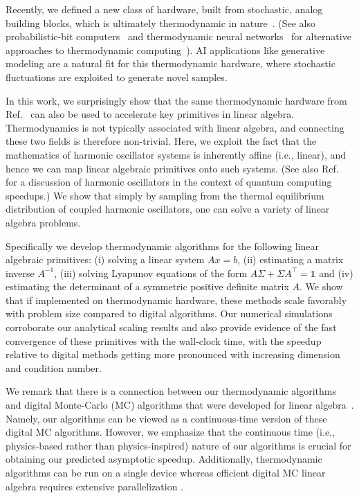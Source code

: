 \documentclass[prx,onecolumn,floatfix,longbibliography,notitlepage, nofootinbib,12pt]{revtex4-2}
\begin{document}
Recently, we defined a new class of hardware, built from stochastic, analog building blocks, which is ultimately thermodynamic in nature~\cite{coles2023thermodynamic}. (See also probabilistic-bit computers~\cite{aadit2022massively,Camsari_2019,kaiser2022life} and thermodynamic neural networks~\cite{hylton2020thermodynamic,hylton2022thermodynamic,ganesh2020rebooting,8123676,lipka2023thermodynamic} for alternative approaches to thermodynamic computing~\cite{conte2019thermodynamic}). AI applications like generative modeling are a natural fit for this thermodynamic hardware, where stochastic fluctuations are exploited to generate novel samples. 

In this work, we surprisingly show that the same thermodynamic hardware from Ref.~\cite{coles2023thermodynamic} can also be used to accelerate key primitives in linear algebra. Thermodynamics is not typically associated with linear algebra, and connecting these two fields is therefore non-trivial. 
Here, we exploit the fact that the mathematics of harmonic oscillator systems is inherently affine (i.e., linear), and hence we can map linear algebraic primitives onto such systems. (See also Ref.~\cite{babbush2023exponential} for a discussion of harmonic oscillators in the context of quantum computing speedups.) We show that simply by sampling from the thermal equilibrium distribution of coupled harmonic oscillators, one can solve a variety of linear algebra problems.

 

Specifically we develop thermodynamic algorithms for the following linear algebraic primitives: (i) solving a linear system $Ax = b$, (ii) estimating a matrix inverse $A^{-1}$, (iii) solving Lyapunov equations \cite{parks1992lyapunov} of the form $A\Sigma+ \Sigma A^{\intercal} = \mathds{1}$ and (iv) estimating the determinant of a symmetric positive definite matrix $A$. We show that if implemented on thermodynamic hardware, these methods scale favorably with problem size compared to digital algorithms. Our numerical simulations corroborate our analytical scaling results and also provide evidence of the fast convergence of these primitives with the wall-clock time, with the speedup relative to digital methods getting more pronounced with increasing dimension and condition number.


We remark that there is a connection between our thermodynamic algorithms and digital Monte-Carlo (MC) algorithms that were developed for linear algebra~\cite{forsythe1950matrix,alexandrov1996comparison,okten2005solving,rosca2006monte,dimov2015new}. Namely, our algorithms can be viewed as a continuous-time version of these digital MC algorithms. However, we emphasize that the continuous time (i.e., physics-based rather than physics-inspired) nature of our algorithms is crucial for obtaining our predicted asymptotic speedup. Additionally, thermodynamic algorithms can be run on a single device \cite{duffield2023thermodynamic} whereas efficient digital MC linear algebra requires extensive parallelization \cite{alexandrov1996comparison}.
\end{document}
